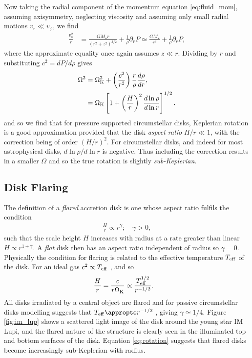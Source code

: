 Now taking the radial component of the momentum equation \ref{eq:fluid_mom}, assuming axisymmetry, neglecting viscosity and assuming only small radial motions $v_r \ll v_\phi$, we find
\begin{align}
    \frac{v_\phi^2}{r} &= \frac{G M_\star r}{\left( r^2 + z^2  \right)^{3/2}} + \frac{1}{\rho} \partial_r P \simeq \frac{G M_\star}{ r^2} + \frac{1}{\rho} \partial_r P, 
\end{align}
where the approximate equality once again assumes $z \ll r$.
Dividing by $r$ and substituting $c^2=dP/d\rho$ gives
\begin{align}
    \Omega^2 &= \Omega_{\rm K}^2 + \left( \frac{c^2}{r^2} \right) \frac{r}{\rho} \frac{d \rho}{dr}, \\
    &= \Omega_{\rm K} \left[ 1 + \left(\frac{H}{r}\right)^2 \frac{d \ln{\rho}}{d \ln{r}} \right]^{1/2} . \label{eq:rotation}
\end{align}
and so we find that for pressure supported circumstellar disks, Keplerian rotation is a good approximation provided that the disk \textit{aspect ratio} $H/r \ll 1$, with the correction being of order $(H/r)^2$.
For circumstellar disks, and indeed for most astrophysical disks, $d\ln{\rho}/d\ln{r}$ is negative.
Thus including the correction results in a smaller $\Omega$ and so the true rotation is slightly \textit{sub-Keplerian}.

\subsection{Disk Flaring} \label{sec:disk_flaring}

The definition of a \textit{flared} accretion disk is one whose aspect ratio fulfils the condition
\begin{align}
    \frac{H}{r} \propto r^\gamma; \quad \gamma > 0, \label{eq:flared_hr}
\end{align}
such that the scale height $H$ increases with radius at a rate greater than linear $H \propto r^{1+\gamma}$. 
A \textit{flat} disk then has an aspect ratio independent of radius so 
$\gamma=0$.
Physically the condition for flaring is related to the effective temperature $T_{\rm eff}$ of the disk.
For an ideal gas $c^2 \propto T_{\rm eff}$ \citep[eg.][]{pringle2007}, and so
\begin{align}
    \frac{H}{r} &= \frac{c}{r \Omega_{\rm K}} \propto \frac{T_{\rm eff}^{1/2}}{r^{-1/2}}.
\end{align}
All disks irradiated by a central object are flared \citep{kenyon1987} and for passive circumstellar disks modelling suggests that $T_{\rm eff} \appropto r^{-1/2}$ \citep{chiang1997}, giving $\gamma \simeq 1/4$.
Figure \ref{fig:im_lup} shows a scattered light image of the disk around the young star IM Lupi, and the flared nature of the structure is clearly seen in the illuminated top and bottom surfaces of the disk.
Equation \ref{eq:rotation} suggests that flared disks become increasingly sub-Keplerian with radius.

